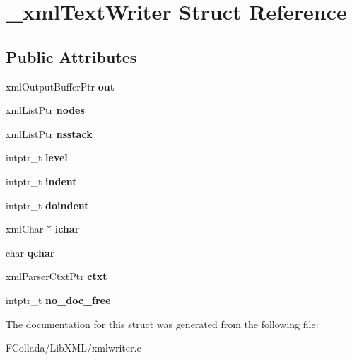 \hypertarget{struct__xmlTextWriter}{
\section{\_\-xmlTextWriter Struct Reference}
\label{struct__xmlTextWriter}
}
\subsection*{Public Attributes}
\begin{DoxyCompactItemize}
\item 
\hypertarget{struct__xmlTextWriter_ad80cedf73aa79d8ff76ba9ed33b155fc}{
xmlOutputBufferPtr {\bfseries out}}
\label{struct__xmlTextWriter_ad80cedf73aa79d8ff76ba9ed33b155fc}

\item 
\hypertarget{struct__xmlTextWriter_aa2f1514247964a0b289cbebb8cf14faa}{
\hyperlink{struct__xmlList}{xmlListPtr} {\bfseries nodes}}
\label{struct__xmlTextWriter_aa2f1514247964a0b289cbebb8cf14faa}

\item 
\hypertarget{struct__xmlTextWriter_a632bc4acbd0eeaa670541dff73ea1589}{
\hyperlink{struct__xmlList}{xmlListPtr} {\bfseries nsstack}}
\label{struct__xmlTextWriter_a632bc4acbd0eeaa670541dff73ea1589}

\item 
\hypertarget{struct__xmlTextWriter_acd953bc3fe3ae8d9d433401520e191d0}{
intptr\_\-t {\bfseries level}}
\label{struct__xmlTextWriter_acd953bc3fe3ae8d9d433401520e191d0}

\item 
\hypertarget{struct__xmlTextWriter_a5c912082356af375372892fca6163e5f}{
intptr\_\-t {\bfseries indent}}
\label{struct__xmlTextWriter_a5c912082356af375372892fca6163e5f}

\item 
\hypertarget{struct__xmlTextWriter_ada04abd0cdfeda2104bf94c0c607d00c}{
intptr\_\-t {\bfseries doindent}}
\label{struct__xmlTextWriter_ada04abd0cdfeda2104bf94c0c607d00c}

\item 
\hypertarget{struct__xmlTextWriter_ac9a49236bee1e150c5e9307dd8e86303}{
xmlChar $\ast$ {\bfseries ichar}}
\label{struct__xmlTextWriter_ac9a49236bee1e150c5e9307dd8e86303}

\item 
\hypertarget{struct__xmlTextWriter_a992627d9f569916fd334d9297ff0af04}{
char {\bfseries qchar}}
\label{struct__xmlTextWriter_a992627d9f569916fd334d9297ff0af04}

\item 
\hypertarget{struct__xmlTextWriter_ad775332fc8cc78749d9aa8bae742f025}{
\hyperlink{struct__xmlParserCtxt}{xmlParserCtxtPtr} {\bfseries ctxt}}
\label{struct__xmlTextWriter_ad775332fc8cc78749d9aa8bae742f025}

\item 
\hypertarget{struct__xmlTextWriter_a303e1eaefe7603e84e41b860b5ec45ab}{
intptr\_\-t {\bfseries no\_\-doc\_\-free}}
\label{struct__xmlTextWriter_a303e1eaefe7603e84e41b860b5ec45ab}

\end{DoxyCompactItemize}


The documentation for this struct was generated from the following file:\begin{DoxyCompactItemize}
\item 
FCollada/LibXML/xmlwriter.c\end{DoxyCompactItemize}
